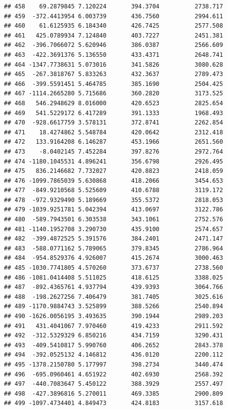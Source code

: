 \documentclass[
]{article}
\begin{document}
\begin{verbatim}
## 458    69.2879845 7.120224       394.3704          2738.717
## 459  -372.4413954 6.003739       436.7560          2994.611
## 460    61.6125935 6.184340       426.7425          2577.508
## 461   425.0789934 7.124840       403.7227          2451.381
## 462  -396.7066072 5.620946       386.0387          2566.609
## 463  -422.3691376 5.136550       433.4371          2648.741
## 464 -1347.7738631 5.073016       341.5826          3080.628
## 465  -267.3818767 5.833263       432.3637          2789.473
## 466  -399.5591451 5.464785       385.1690          2504.425
## 467 -1114.2665280 5.715686       360.2820          3173.525
## 468   546.2948629 8.016000       420.6523          2825.654
## 469   541.5229172 6.417289       391.1333          1968.493
## 470  -928.6617759 3.578131       372.8741          2262.854
## 471    18.4274862 5.548784       420.0642          2312.418
## 472   133.9164208 6.146287       453.1966          2651.560
## 473    -8.0402145 7.452284       397.8276          2972.764
## 474 -1180.1045531 4.896241       356.6798          2926.495
## 475   836.2146682 7.732027       420.8823          2418.059
## 476 -1099.7865039 5.630868       418.2066          3454.653
## 477  -849.9210568 5.525609       410.6788          3119.172
## 478  -972.9329490 5.189669       355.5372          2818.053
## 479 -1039.9251781 5.042394       413.0697          3122.786
## 480  -589.7943501 6.303538       343.1061          2752.576
## 481 -1140.1952708 3.290730       435.9100          2574.657
## 482  -399.4872525 5.391576       384.2401          2471.147
## 483  -588.0771162 5.789065       379.8345          2786.964
## 484  -954.8529376 4.926007       415.2674          3000.463
## 485 -1030.7741805 4.570260       373.6737          2738.560
## 486 -1081.0414408 5.511025       418.6125          3388.025
## 487  -892.4365761 4.937794       439.9393          3064.766
## 488  -198.2627256 7.406479       381.7405          3025.616
## 489 -1170.9884743 3.525899       388.5266          2540.894
## 490 -1626.0056195 3.493635       390.1944          2989.203
## 491   431.4041067 7.970460       419.4233          2911.592
## 492  -312.5329329 6.850216       434.7159          3290.431
## 493  -409.5410817 5.990760       406.2652          2843.378
## 494  -392.0525132 4.146812       436.0120          2200.112
## 495 -1378.2150780 5.177997       398.2734          3440.474
## 496  -695.0960461 4.651922       402.6930          2568.392
## 497  -440.7083647 5.450122       388.3929          2557.497
## 498  -427.3896816 5.270011       469.3385          2900.809
## 499 -1097.4734401 4.849473       424.8183          3157.618

\end{verbatim}
\end{document}
